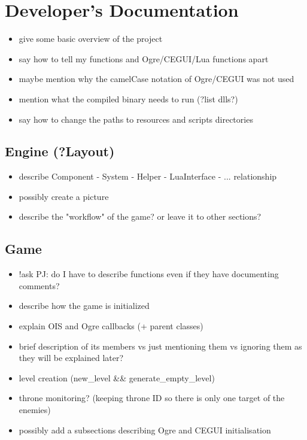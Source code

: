 \chapter{Developer's Documentation}

\begin{itemize}
    \item give some basic overview of the project
    \item say how to tell my functions and Ogre/CEGUI/Lua functions apart
    \item maybe mention why the camelCase notation of Ogre/CEGUI was not used
    \item mention what the compiled binary needs to run (?list dlls?)
    \item say how to change the paths to resources and scripts directories
\end{itemize}

\section{Engine (?Layout)}

\begin{itemize}
    \item describe Component - System - Helper - LuaInterface - ... relationship
    \item possibly create a picture
    \item describe the "workflow" of the game? or leave it to other sections?
\end{itemize}

\section{Game}

\begin{itemize}
    \item !ask PJ: do I have to describe functions even if they have documenting comments? 
    \item describe how the game is initialized
    \item explain OIS and Ogre callbacks (+ parent classes)
    \item brief description of its members vs just mentioning them vs ignoring them as they will be explained later?
    \item level creation (new\_level \&\& generate\_empty\_level)
    \item throne monitoring? (keeping throne ID so there is only one target of the enemies)
    \item possibly add a subsections describing Ogre and CEGUI initialisation
\end{itemize}

